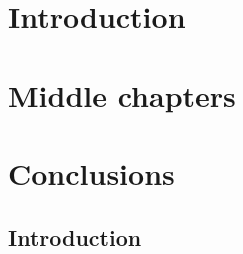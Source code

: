 \documentclass[twoside,12pt, a4paper]{report}
\begin{document}




\clearpage



\clearpage



\clearpage



\clearpage



\clearpage

\tableofcontents

\clearpage

\listoftables

\clearpage

\listoffigures

\clearpage


\pagestyle{main}

\chapter{Introduction}




\chapter{Middle chapters}


\chapter{Conclusions}


\begin{appendices}

\chapter{Introduction}
\label{appendix_introduction}


\end{appendices}

\clearpage %
\printbibliography[heading=bibintoc,title=References]
\end{document}
